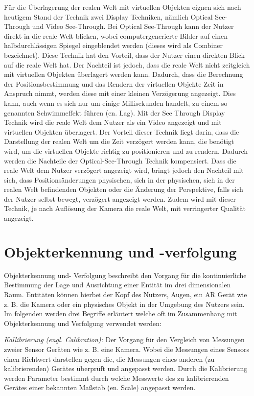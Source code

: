 \cite[S.~32]{Tonnis2010} Für die Überlagerung der realen Welt mit virtuellen Objekten eignen sich nach heutigem Stand der Technik zwei Display Techniken, nämlich Optical See-Through und Video See-Through. 
Bei Optical See-Through kann der Nutzer direkt in die reale Welt blicken, wobei computergenerierte Bilder auf einen halbdurchlässigen Spiegel eingeblendet werden (dieses wird als Combiner bezeichnet).
Diese Technik hat den Vorteil, dass der Nutzer einen direkten Blick auf die reale Welt hat. Der Nachteil ist jedoch, dass die reale Welt nicht zeitgleich mit virtuellen Objekten überlagert werden kann. 
Dadurch, dass die Berechnung der Positionsbestimmung und das Rendern der virtuellen Objekte Zeit in Anspruch nimmt, werden diese mit einer kleinen Verzögerung angezeigt. Dies kann, auch 
wenn es sich nur um einige Millisekunden handelt, zu einem so genannten Schwimmeffekt führen (en. Lag). Mit der See Through Display Technik wird die reale Welt dem Nutzer als ein Video 
angezeigt und mit virtuellen Objekten überlagert. Der Vorteil dieser Technik liegt darin, dass die Darstellung der realen Welt um die Zeit verzögert werden kann, die benötigt wird, um die virtuellen Objekte 
richtig zu positionieren und zu rendern. Dadurch werden die Nachteile der Optical-See-Through Technik kompensiert. Dass die reale Welt dem Nutzer verzögert angezeigt wird, bringt jedoch den Nachteil mit sich, 
dass Positionsänderungen physischen, sich in der physischen, sich in der realen Welt befindenden Objekten oder die Änderung der Perspektive, falls sich der Nutzer selbst bewegt, verzögert angezeigt werden. Zudem wird mit 
dieser Technik, je nach Auflösung der Kamera die reale Welt, mit verringerter Qualität angezeigt.

\section{Objekterkennung und -verfolgung}

\cite[S.~85]{DieterSchmalstieg2016}Objekterkennung und- Verfolgung beschreibt den Vorgang für die kontinuierliche Bestimmung der Lage und Ausrichtung einer Entität im drei dimensionalen Raum. 
Entitäten können hierbei der Kopf des Nutzers, Augen, ein AR Gerät wie z. B. die Kamera oder ein physisches Objekt in der Umgebung des Nutzers sein. 
Im folgenden werden drei Begriffe erläutert welche oft im Zusammenhang mit Objekterkennung und Verfolgung verwendet werden:
 
\textit{Kallibrierung (engl. Calibration):} Der Vorgang für den Vergleich von Messungen zweier Sensor Geräten wie z. B. eine Kamera. Wobei die Messungen eines Sensors einen Richtwert darstellen gegen die, die
Messungen eines anderen (zu kalibrierenden) Gerätes überprüft und angepasst werden. Durch die Kalibrierung werden Parameter bestimmt durch welche Messwerte des zu kalibrierenden Gerätes einer bekannten 
Maßstab (en. Scale) angepasst werden. 


